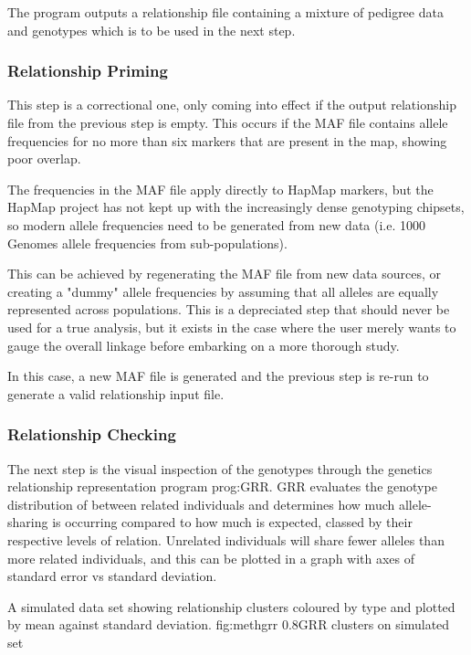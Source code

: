 The program outputs a relationship file containing a mixture of pedigree data and genotypes which is to be used in the next step.

\subsubsection{Relationship Priming}

This step is a correctional one, only coming into effect if the output relationship file from the previous step is empty. This occurs if the MAF file contains allele frequencies for no more than six markers that are present in the map, showing poor overlap.

The frequencies in the MAF file apply directly to HapMap markers, but the HapMap project has not kept up with the increasingly dense genotyping chipsets, so modern allele frequencies need to be generated from new data (i.e. 1000 Genomes allele frequencies from sub-populations).

This can be achieved by regenerating the MAF file from new data sources, or creating a "dummy" allele frequencies by assuming that all alleles are equally represented across populations. This is a depreciated step that should never be used for a true analysis, but it exists in the case where the user merely wants to gauge the overall linkage before embarking on a more thorough study.

In this case, a new MAF file is generated and the previous step is re-run to generate a valid relationship input file.

\subsubsection{Relationship Checking}

The next step is the visual inspection of the genotypes through the genetics relationship representation program \gls{prog:GRR}. GRR evaluates the genotype distribution of between related individuals and determines how much allele-sharing is occurring compared to how much is expected, classed by their respective levels of relation. Unrelated individuals will share fewer alleles than more related individuals, and this can be plotted in a graph with axes of standard error vs standard deviation\citep{grr}. 

	{A simulated data set showing relationship clusters coloured by type and plotted by mean against standard deviation.}
	{fig:methgrr}
	{0.8}{GRR clusters on simulated set}
	
